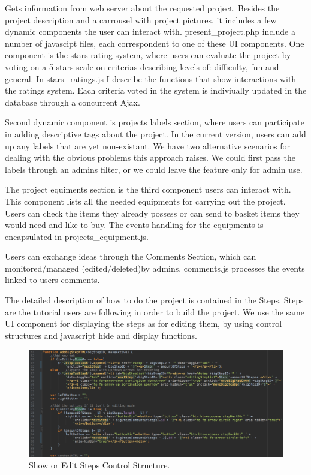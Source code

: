 Gets information from web server about the requested project.
Besides the project description and a carrousel with project pictures, it includes a few dynamic components the user can interact with. present\_project.php include a number of javascipt files, each correspondent to one of these UI components.
One component is the stars rating system, where users can evaluate the project by voting on a 5 stars scale on criterias describing levels of: difficulty, fun and general. In stars\_ratings.js I describe the functions  that show interactions with the ratings system. Each criteria voted in the system is indiviually updated in the database through a concurrent Ajax.

Second dynamic component is projects labels section, where users can participate in adding descriptive tags about the project. In the current version, users can add up any labels that are yet non-existant. We have two alternative scenarios for dealing with the obvious problems this approach raises. We could first pass the labels through an admins filter, or we could leave the feature only for admin use. 

The project equiments section is the third component users can interact with. This component lists all the needed equipments for carrying out the project. Users can check the items they already possess or can send to basket items they would need and like to buy. The events handling for the equipments is encapsulated in projects\_equipment.js. 

Users can exchange ideas through the Comments Section, which can monitored/managed (edited/deleted)by admins.
comments.js processes the events linked to users comments.

The detailed description of how to do the project is contained in the Steps. Steps are the tutorial users are following in order to build the project. We use the same UI component for displaying the steps as for editing them, by using control structures and javascript hide and display functions. 

\begin{figure}
\includegraphics[width=1\linewidth]{images/stepsEdit&Present.png}
\caption{Show or Edit Steps Control Structure.}
\label{fig:edit_present_steps.}
\end{figure}	







